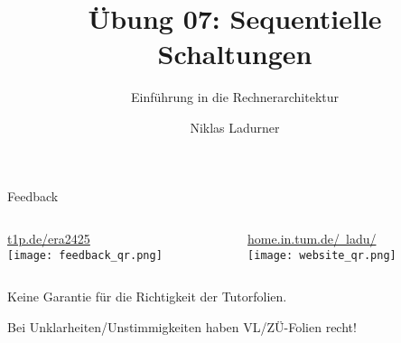 \documentclass[
  german,            %
  aspectratio=169,    %
]{tumbeamer}
\title{Übung 07: Sequentielle \\Schaltungen}
\subtitle{Einführung in die Rechnerarchitektur}
\author{Niklas Ladurner}
\institute{\theChairName\\\theDepartmentName\\\theUniversityName}
\date{\DTMdisplaydate{2024}{11}{29}{-1}}
\begin{document}
\maketitle

\begin{frame}[c]{Feedback}{}
	\begin{columns}[c]
		\begin{column}{0.5\textwidth}
			\begin{center}
				\LARGE  \href{https://t1p.de/era2425}{t1p.de/era2425}\\
				\texttt{[image: feedback\_qr.png]}
			\end{center}
		\end{column}
		\begin{column}{0.5\textwidth}
			\begin{center}
				\LARGE  \href{https://home.in.tum.de/~ladu/}{home.in.tum.de/\string~ladu/}\\
				\texttt{[image: website\_qr.png]}
			\end{center}
		\end{column}
	\end{columns}
\end{frame}

\begin{frame}[c, fragile]{}{}
	\begin{center}
		\LARGE  Keine Garantie für die Richtigkeit der Tutorfolien.

		\Large Bei Unklarheiten/Unstimmigkeiten haben VL/ZÜ-Folien recht!
	\end{center}
\end{frame}
\end{document}

